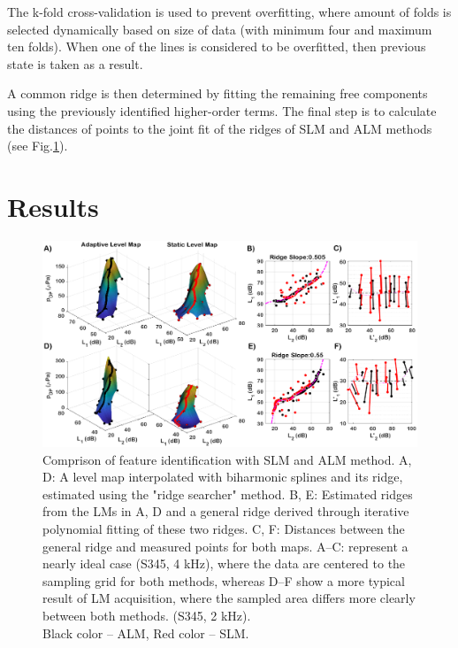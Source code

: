 \documentclass[journal,twoside,web]{ieeecolor2}
\begin{document}
The k-fold cross-validation is used to prevent overfitting, where amount of folds is selected dynamically based on size of data (with minimum four and maximum ten folds).
When one of the lines is considered to be overfitted, then previous state is taken as a result.

A common ridge is then determined by fitting the remaining free components using the previously identified higher-order terms.
The final step is to calculate the distances of points to the joint fit of the ridges of SLM and ALM methods (see Fig.\ref{fig_BLK}).

\section{Results}

\begin{figure}
\includegraphics[width=\textwidth]{Fig_5_assembly2.eps} %
\caption{Comprison of feature identification with SLM and ALM method. A, D: A level map interpolated with biharmonic splines and its ridge, estimated using the "ridge searcher" method.
B, E: Estimated ridges from the LMs in A, D and a general ridge derived through iterative polynomial fitting of these two ridges.
C, F: Distances between the general ridge and measured points for both maps.
A–C: represent a nearly ideal case (S345, 4 kHz), where the data are centered to the sampling grid for both methods, whereas D–F show a more typical result of LM acquisition, where the sampled area differs more clearly between both methods. (S345, 2 kHz).\\ Black color – ALM, Red color – SLM.}
\label{fig_BLK}
\end{figure}
\end{document}
